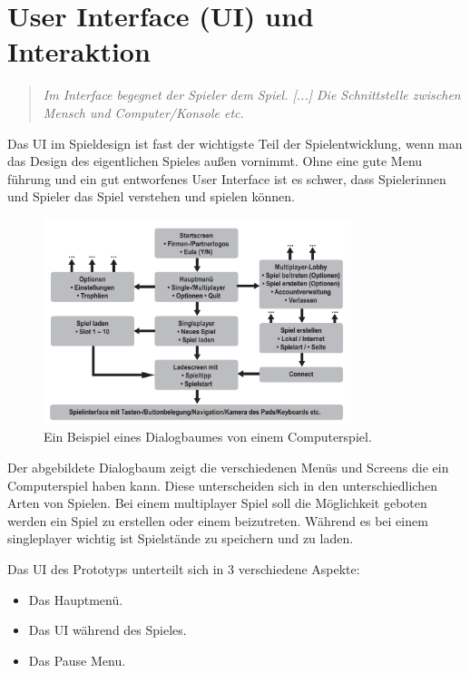 \chapter{User Interface (UI) und Interaktion}

\begin{quote}
\emph{\glqq Im Interface begegnet der Spieler dem Spiel. [...] Die Schnittstelle zwischen Mensch und Computer/Konsole etc.\grqq}~\cite[p.~161]{GameDesign} \\
\end{quote}

Das UI im Spieldesign ist fast der wichtigste Teil der Spielentwicklung, wenn man das Design des eigentlichen Spieles außen vornimmt. 
Ohne eine gute Menu führung und ein gut entworfenes User Interface ist es schwer, dass Spielerinnen und Spieler das Spiel verstehen und spielen können. 

\begin{figure}[H]
    \centering
    \includegraphics[width=0.8\textwidth]{chapters/03/images/Spielinterface.png}
    \caption{Ein Beispiel eines Dialogbaumes von einem Computerspiel.}
    \label{htl01}
\end{figure}

Der abgebildete Dialogbaum zeigt die verschiedenen Menüs und Screens die ein Computerspiel haben kann.
Diese unterscheiden sich in den unterschiedlichen Arten von Spielen. 
Bei einem \gls{multiplayer} Spiel soll die Möglichkeit geboten werden ein Spiel zu erstellen oder einem beizutreten. 
Während es bei einem \gls{singleplayer} wichtig ist Spielstände zu speichern und zu laden.

Das \gls{UI} des Prototyps unterteilt sich in 3 verschiedene Aspekte:

\begin{itemize}
    \item Das Hauptmenü.
    \item Das \gls{UI} während des Spieles.
    \item Das Pause Menu.
\end{itemize}


